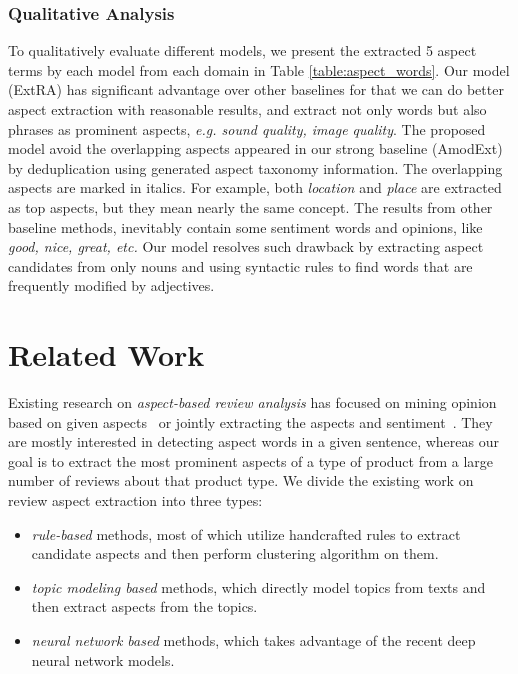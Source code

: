 \documentclass[11pt,a4paper]{article}
\newcommand{\tabref}[1]{Table \ref{#1}}
\begin{document}
\subsubsection{Qualitative Analysis}
To qualitatively evaluate different models,
we present the extracted 5 aspect terms by each model from each domain in \tabref{table:aspect_words}. 
Our model (ExtRA) has significant advantage over other baselines for that we can do better aspect extraction with reasonable results, and extract not only words but also phrases as prominent aspects, \textit{e.g. sound quality, image quality}. The proposed model avoid the overlapping aspects appeared in our strong baseline (AmodExt) by deduplication using generated aspect taxonomy information. The overlapping aspects are marked in italics. For example, both \textit{location} and \textit{place} are extracted as top aspects, but they mean nearly the same concept. The results from other baseline methods, inevitably contain some sentiment words and opinions, like \textit{good, nice, great, etc.} Our model resolves such drawback by extracting aspect candidates from only nouns and using syntactic rules to find words that are frequently modified by adjectives.

\section{Related Work}
\label{sec:related}
Existing research on \textit{aspect-based review analysis} 
has focused on mining opinion based on given aspects~\cite{su2008hidden,zeng2013classification} or jointly extracting the aspects and 
sentiment~\cite{lin2009joint,zhao2010jointly,qiu2011opinion,wang2015sentiment,liu2016improving}. 
They are mostly interested in detecting aspect words in a given sentence, 
whereas our goal is to extract the most prominent aspects of a type of
product from a large number of reviews about that product type.
We divide the existing work on review aspect extraction into three types:
\begin{itemize}
	\item \textit{rule-based} methods, most of which utilize 
	handcrafted rules to extract candidate aspects
	and then perform clustering algorithm on them.
	\item \textit{topic modeling based} methods, which directly model 
	topics from texts and then extract aspects from the topics.
	\item \textit{neural network based} methods, which takes advantage
	of the recent deep neural network models.
\end{itemize}
\end{document}
